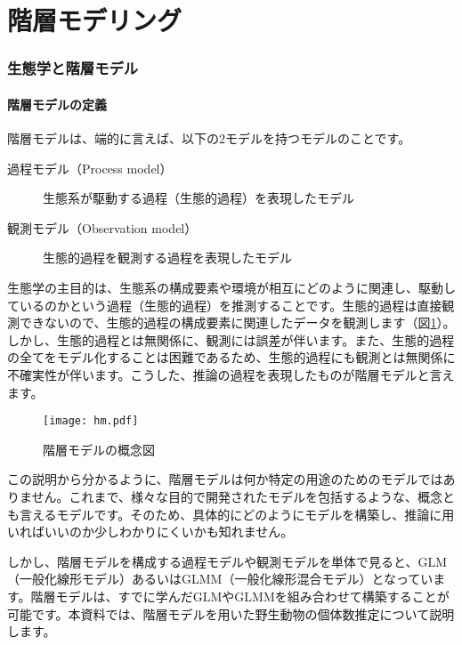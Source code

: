 \part{階層モデリング}
\label{stathm}

\section{生態学と階層モデル}
\subsection{階層モデルの定義}
階層モデルは、端的に言えば、以下の2モデルを持つモデルのことです。
\begin{description}
	\item[過程モデル（Process model）] 生態系が駆動する過程（生態的過程）を表現したモデル
	\item[観測モデル（Observation model）] 生態的過程を観測する過程を表現したモデル
\end{description}
生態学の主目的は、生態系の構成要素や環境が相互にどのように関連し、駆動しているのかという過程（生態的過程）を推測することです。生態的過程は直接観測できないので、生態的過程の構成要素に関連したデータを観測します（図\ref{hm}）。しかし、生態的過程とは無関係に、観測には誤差が伴います。また、生態的過程の全てをモデル化することは困難であるため、生態的過程にも観測とは無関係に不確実性が伴います。こうした、推論の過程を表現したものが階層モデルと言えます。
\begin{figure}[htb]
\begin{center}
\graphicspath{{4_hm/figs/}}
\texttt{[image: hm.pdf]}\\
\caption{階層モデルの概念図}
\label{hm}
\end{center}
\end{figure}

この説明から分かるように、階層モデルは何か特定の用途のためのモデルではありません。これまで、様々な目的で開発されたモデルを包括するような、概念とも言えるモデルです。そのため、具体的にどのようにモデルを構築し、推論に用いればいいのか少しわかりにくいかも知れません。

しかし、階層モデルを構成する過程モデルや観測モデルを単体で見ると、GLM（一般化線形モデル）あるいはGLMM（一般化線形混合モデル）となっています。階層モデルは、すでに学んだGLMやGLMMを組み合わせて構築することが可能です。本資料では、階層モデルを用いた野生動物の個体数推定について説明します。

